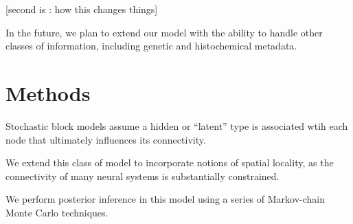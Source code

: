 \documentclass{article}
\begin{document}
[second is : how this changes things]

In the future, we plan to extend our model with the ability to handle
other classes of information, including genetic and histochemical
metadata.



\section{Methods}
Stochastic block models assume a hidden or ``latent'' type is associated
wtih each node that ultimately influences its connectivity. 

We extend this class of model to incorporate notions of spatial locality, 
as the connectivity of many neural systems is substantially constrained. 

We perform posterior inference in this model using a series of Markov-chain
Monte Carlo techniques. 
\end{document}
